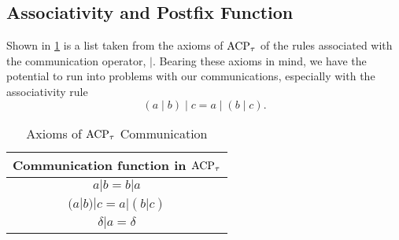 \documentclass[../hons_project.tex]{subfiles}
\begin{document}
\subsection{Associativity and Postfix Function}\label{ssec:postfix}
Shown in \cref{table:acpt-communication} is a list taken from the axioms of $\mathrm{ACP}_{\tau}$ \cite{bergstraACPtUniversalAxiom1989} of the rules associated with the communication operator, $\mid$. Bearing these axioms in mind, we have the potential to run into problems with our communications, especially with the associativity rule
\begin{equation}\label{eq:associativity-rule}
	(a \mid b) \mid c = a \mid (b \mid c).
\end{equation}

\begin{table}[ht!]
	\centering
	\begin{tabular}{ |c| }
		\hline
		\textbf{Communication function in $\mathrm{ACP}_{\tau}$} \\
		\hline
		$a | b = b | a$                            \\
		$(a | b) | c = a | (b | c)$                \\
		$\delta | a = \delta$                      \\
		\hline
	\end{tabular}
	\caption{Axioms of $\mathrm{ACP}_{\tau}$ Communication}
	\label{table:acpt-communication}
\end{table}
\end{document}
